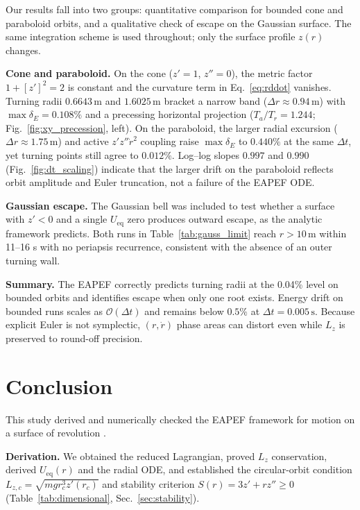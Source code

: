 \documentclass[11pt,letterpaper]{article}
\newcommand{\parhead}[1]{\par\medskip\noindent\textbf{#1}\ignorespaces}
\begin{document}
Our results fall into two groups: quantitative comparison for bounded cone and paraboloid orbits, and a qualitative check of escape on the Gaussian surface. The same integration scheme is used throughout; only the surface profile $z(r)$ changes.

\parhead{Cone and paraboloid.}
On the cone ($z'=1$, $z''=0$), the metric factor $1+[z']^2=2$ is constant and the curvature term in Eq.~\eqref{eq:rddot} vanishes. Turning radii $0.6643\,\mathrm{m}$ and $1.6025\,\mathrm{m}$ bracket a narrow band ($\Delta r\approx 0.94\,\mathrm{m}$) with $\max\delta_E=0.108\%$ and a precessing horizontal projection ($T_a/T_r=1.244$; Fig.~\ref{fig:xy_precession}, left). On the paraboloid, the larger radial excursion ($\Delta r\approx 1.75\,\mathrm{m}$) and active $z'z''\dot{r}^2$ coupling raise $\max\delta_E$ to $0.440\%$ at the same $\Delta t$, yet turning points still agree to $0.012\%$. Log--log slopes $0.997$ and $0.990$ (Fig.~\ref{fig:dt_scaling}) indicate that the larger drift on the paraboloid reflects orbit amplitude and Euler truncation, not a failure of the EAPEF ODE.

\parhead{Gaussian escape.}
The Gaussian bell was included to test whether a surface with $z'<0$ and a single $U_{\mathrm{eq}}$ zero produces outward escape, as the analytic framework predicts. Both runs in Table~\ref{tab:gauss_limit} reach $r>10\,\mathrm{m}$ within 11--16 s with no periapsis recurrence, consistent with the absence of an outer turning wall.

\parhead{Summary.}
The EAPEF correctly predicts turning radii at the 0.04\% level on bounded orbits and identifies escape when only one root exists. Energy drift on bounded runs scales as $\mathcal{O}(\Delta t)$ and remains below $0.5\%$ at $\Delta t=0.005\,\mathrm{s}$. Because explicit Euler is not symplectic, $(r,\dot{r})$ phase areas can distort even while $L_z$ is preserved to round-off precision.

\section{Conclusion}
\label{sec:conclusion}

This study derived and numerically checked the EAPEF framework for motion on a surface of revolution \cite{ajp2026}.

\parhead{Derivation.}
We obtained the reduced Lagrangian, proved $L_z$ conservation, derived $U_{\mathrm{eq}}(r)$ and the radial ODE, and established the circular-orbit condition $L_{z,c}=\sqrt{mgr_c^3 z'(r_c)}$ and stability criterion $S(r)=3z'+rz''\ge 0$ (Table~\ref{tab:dimensional}, Sec.~\ref{sec:stability}).
\end{document}
